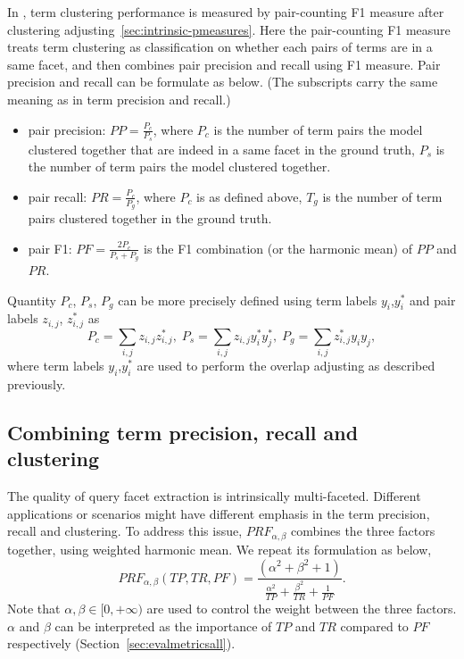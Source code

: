 In \PRF, term clustering performance is measured by pair-counting F1 measure after clustering adjusting~\ref{sec:intrinsic-pmeasures}. Here the pair-counting F1 measure treats term clustering as classification on whether each pairs of terms are in a same facet, and then combines pair precision and recall using F1 measure. Pair precision and recall can be formulate as below. (The subscripts carry the same meaning as in term precision and recall.)
\begin{itemize}
 \item pair precision: $P\!P = \frac{P_c}{P_s}$, where $P_c$ is the number of term pairs the model clustered together that are indeed in a same facet in the ground truth, $P_s$ is the number of term pairs the model clustered together. 
 \item pair recall: $P\!R = \frac{P_c}{P_g}$, where $P_c$ is as defined above, $T_g$ is the number of term pairs clustered together in the ground truth.
 \item pair F1: $P\!F=\frac{2P_c}{P_s+P_g}$ is the F1 combination (or the harmonic mean) of $P\!P$ and $P\!R$.
\end{itemize}
Quantity $P_c$, $P_s$, $P_g$ can be more precisely defined using term labels $y_i$,$y_i^{*}$ and pair labels $z_{i,j}$, $z_{i,j}^{*}$ as
\begin{equation}
\label{eq:qpair}
 P_c=\sum_{i,j}{z_{i,j}z_{i,j}^{*}}, \; P_s=\sum_{i,j}{z_{i,j}}y_i^*y_j^*, \; P_g=\sum_{i,j}{z_{i,j}^*}y_iy_j,
\end{equation}
where term labels $y_i$,$y_i^{*}$ are used to perform the overlap adjusting as described previously.

\subsection{Combining term precision, recall and clustering}
The quality of query facet extraction is intrinsically multi-faceted. Different applications or scenarios might have different emphasis in the term precision, recall and clustering. To address this issue, $P\!R\!F_{\alpha,\beta}$ combines the three factors together, using weighted harmonic mean. We repeat its formulation as below,
\begin{equation}
\label{eq:prf2}
 P\!R\!F_{\alpha,\beta}(T\!P, T\!R, P\!F) = \frac{(\alpha^2 + \beta^2 + 1)}{\frac{\alpha^2}{T\!P} + \frac{\beta^2}{T\!R} + \frac{1}{P\!F}}.
\end{equation}
Note that $\alpha,\beta \in [0,+\infty)$ are used to control the weight between the three factors. $\alpha$ and $\beta$ can be interpreted as the importance of $T\!P$ and $T\!R$ compared to $P\!F$ respectively (Section~\ref{sec:evalmetricsall}).

